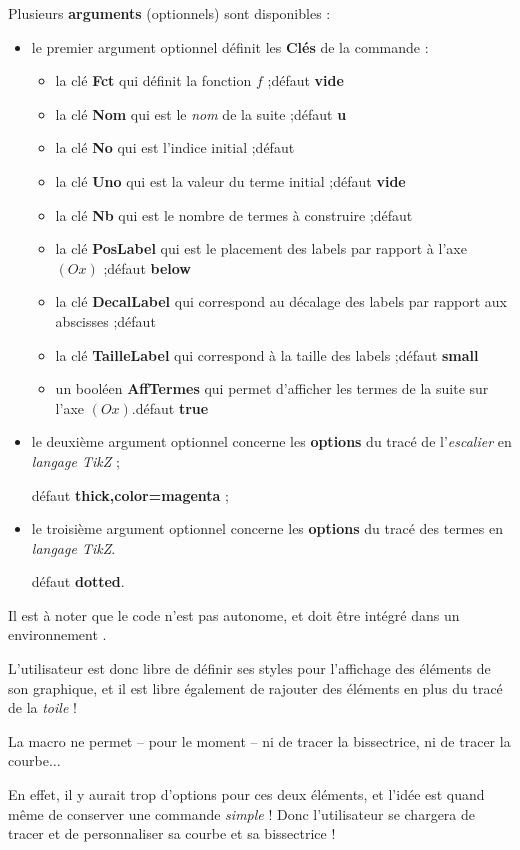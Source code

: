 \documentclass[a4paper,french,11pt]{article}
\providecommand\tikzlogo{Ti\textit{k}Z}
\let\TikZ\tikzlogo
\newcommand\ctex[1]{\tcbox[vignettelatex]{#1}}
\newcommand\Cle[1]{{\bfseries\sffamily\textlangle #1\textrangle}}
\begin{document}
\begin{codecles}
Plusieurs \Cle{arguments} (optionnels) sont disponibles :

\begin{itemize}
	\item le premier argument optionnel définit les \Cle{Clés} de la commande :
	\begin{itemize}
		\item la clé \Cle{Fct} qui définit la fonction $f$ ;\hfill{}défaut \Cle{vide}
		\item la clé \Cle{Nom} qui est le \textit{nom} de la suite ;\hfill{}défaut \Cle{u}
		\item la clé \Cle{No} qui est l'indice initial ;\hfill{}défaut \Cle{0}
		\item la clé \Cle{Uno} qui est la valeur du terme initial ;\hfill{}défaut \Cle{vide}
		\item la clé \Cle{Nb} qui est le nombre de termes à construire ;\hfill{}défaut \Cle{5}
		\item la clé \Cle{PosLabel} qui est le placement des labels par rapport à l'axe $(Ox)$ ;\hfill{}défaut \Cle{below}
		\item la clé \Cle{DecalLabel} qui correspond au décalage des labels par rapport aux abscisses ;\hfill{}défaut \Cle{6pt}
		\item la clé \Cle{TailleLabel} qui correspond à la taille des labels ;\hfill{}défaut \Cle{small}
		\item un booléen \Cle{AffTermes} qui permet d'afficher les termes de la suite sur l'axe $(Ox)$.\hfill{}défaut \Cle{true}
	\end{itemize}
	\item le deuxième argument optionnel concerne les \Cle{options} du tracé de l'\textit{escalier} en \textit{langage \TikZ} ;
	
	\hfill{}défaut \Cle{thick,color=magenta} ;
	\item le troisième argument optionnel concerne les \Cle{options} du tracé des termes en \textit{langage \TikZ}.
	
	\hfill{}défaut \Cle{dotted}.
\end{itemize}
\end{codecles}

\begin{codeinfo}
Il est à noter que le \textsf{code} n'est pas autonome, et doit être intégré dans un environnement \ctex{tikzpicture}.

\smallskip

L'utilisateur est donc libre de définir ses styles pour l'affichage des éléments de son graphique, et il est libre également de rajouter des éléments en plus du tracé de la \textit{toile} !

\smallskip

La macro ne permet -- pour le moment -- ni de tracer la bissectrice, ni de tracer la courbe$\ldots$

En effet, il y aurait trop d'options pour ces deux éléments, et l'idée est quand même de conserver une commande \textit{simple} ! Donc l'utilisateur se chargera de tracer et de personnaliser sa courbe et sa bissectrice !
\end{codeinfo}
\end{document}
